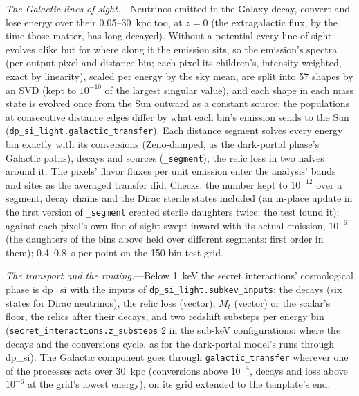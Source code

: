 \documentclass[11pt,a4paper]{article}
\begin{document}
\textit{The Galactic lines of sight.}---Neutrinos emitted in the Galaxy decay, convert and lose energy over their
0.05--30~kpc too, at $z = 0$ (the extragalactic flux, by the time those matter, has long decayed). Without a potential
every line of sight evolves alike but for where along it the emission sits, so the emission's spectra (per output pixel
and distance bin; each pixel its children's, intensity-weighted, exact by linearity), scaled per energy by the sky mean,
are split into 57 shapes by an SVD (kept to $10^{-10}$ of the largest singular value), and each shape in each mass state
is evolved once from the Sun outward as a constant source: the populations at consecutive distance edges differ by what
each bin's emission sends to the Sun (\texttt{dp\_si\_light.galactic\_transfer}). Each distance segment solves every
energy bin exactly with its conversions (Zeno-damped, as the dark-portal phase's Galactic paths), decays and sources
(\texttt{\_segment}), the relic loss in two halves around it. The pixels' flavor fluxes per unit emission enter the
analysis' bands and sites as the averaged transfer did. Checks: the number kept to $10^{-12}$ over a segment, decay chains
and the Dirac sterile states included (an in-place update in the first version of \texttt{\_segment} created sterile
daughters twice; the test found it); against each pixel's own line of sight swept inward with its actual emission,
$10^{-6}$ (the daughters of the bins above held over different segments: first order in them); 0.4--0.8~s per point on
the 150-bin test grid.

\textit{The transport and the routing.}---Below 1~keV the secret interactions' cosmological phase is dp\_si with the
inputs of \texttt{dp\_si\_light.subkev\_inputs}: the decays (six states for Dirac neutrinos), the relic loss (vector),
$M_t$ (vector) or the scalar's floor, the relics after their decays, and two redshift substeps per energy bin
(\texttt{secret\_interactions.z\_substeps} 2 in the sub-keV configurations: where the decays and the conversions cycle,
as for the dark-portal model's runs through dp\_si). The Galactic component goes through
\texttt{galactic\_transfer} wherever one of the processes acts over 30~kpc (conversions above $10^{-4}$, decays and loss
above $10^{-6}$ at the grid's lowest energy), on its grid extended to the template's end.
\end{document}
